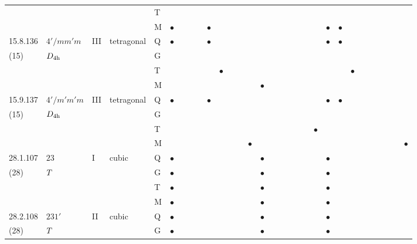 \documentclass[fleqn,9pt,landscape]{jsarticle}
\begin{document}
\begin{longtable}{lllll|l|lll|ll|lll|l|lll|lll|l|ll|lll|lll}
 &  &  &  & T &  &  &  &  &  &  &  &  &  &  &  &  &  &  &  &  &  &  &  &  &  &  &  &  &  \\
 &  &  &  & M & $\bullet$ &  &  &  & $\bullet$ &  &  &  &  &  &  &  &  &  &  &  & $\bullet$ & $\bullet$ &  &  &  &  &  &  &  \\ \hline
15.8.136 & \texttt{$4'/mm'm$} & III & tetragonal & Q & $\bullet$ &  &  &  & $\bullet$ &  &  &  &  &  &  &  &  &  &  &  & $\bullet$ & $\bullet$ &  &  &  &  &  &  &  \\
(15) & $D_{\rm 4h}$ &  &  & G &  &  &  &  &  &  &  &  &  &  &  &  &  &  &  &  &  &  &  &  &  &  &  &  &  \\
 &  &  &  & T &  &  &  &  &  & $\bullet$ &  &  &  &  &  &  &  &  &  &  &  &  & $\bullet$ &  &  &  &  &  &  \\
 &  &  &  & M &  &  &  &  &  &  &  &  &  & $\bullet$ &  &  &  &  &  &  &  &  &  &  &  &  &  &  &  \\ \hline
15.9.137 & \texttt{$4'/m'm'm$} & III & tetragonal & Q & $\bullet$ &  &  &  & $\bullet$ &  &  &  &  &  &  &  &  &  &  &  & $\bullet$ & $\bullet$ &  &  &  &  &  &  &  \\
(15) & $D_{\rm 4h}$ &  &  & G &  &  &  &  &  &  &  &  &  &  &  &  &  &  &  &  &  &  &  &  &  &  &  &  &  \\
 &  &  &  & T &  &  &  &  &  &  &  &  &  &  &  &  &  &  &  & $\bullet$ &  &  &  &  &  &  &  &  &  \\
 &  &  &  & M &  &  &  &  &  &  &  &  & $\bullet$ &  &  &  &  &  &  &  &  &  &  &  &  &  &  &  & $\bullet$ \\ \hline
28.1.107 & \texttt{$23$} & I & cubic & Q & $\bullet$ &  &  &  &  &  &  &  &  & $\bullet$ &  &  &  &  &  &  & $\bullet$ &  &  &  &  &  &  &  &  \\
(28) & $T_{\rm }$ &  &  & G & $\bullet$ &  &  &  &  &  &  &  &  & $\bullet$ &  &  &  &  &  &  & $\bullet$ &  &  &  &  &  &  &  &  \\
 &  &  &  & T & $\bullet$ &  &  &  &  &  &  &  &  & $\bullet$ &  &  &  &  &  &  & $\bullet$ &  &  &  &  &  &  &  &  \\
 &  &  &  & M & $\bullet$ &  &  &  &  &  &  &  &  & $\bullet$ &  &  &  &  &  &  & $\bullet$ &  &  &  &  &  &  &  &  \\ \hline
28.2.108 & \texttt{$231'$} & II & cubic & Q & $\bullet$ &  &  &  &  &  &  &  &  & $\bullet$ &  &  &  &  &  &  & $\bullet$ &  &  &  &  &  &  &  &  \\
(28) & $T_{\rm }$ &  &  & G & $\bullet$ &  &  &  &  &  &  &  &  & $\bullet$ &  &  &  &  &  &  & $\bullet$ &  &  &  &  &  &  &  &  \\

\end{longtable}
\end{document}
